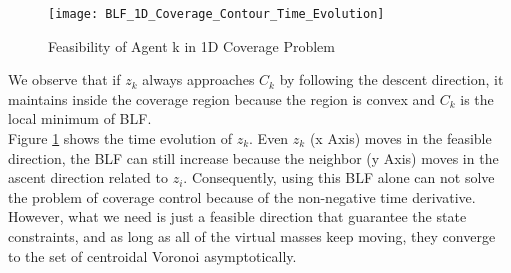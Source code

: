 \begin{figure} [!h]
	\centering
	\texttt{[image: BLF\_1D\_Coverage\_Contour\_Time\_Evolution]}
	\caption{Feasibility of Agent k in 1D Coverage Problem}
	\label{fig:BLF_2D_2}
\end{figure}
\noindent We observe that if $z_k$ always approaches $C_k$ by following the descent direction, it maintains inside the coverage region because the region is convex and $C_k$ is the local minimum of BLF. \\
Figure \ref{fig:BLF_2D_2} shows the time evolution of $z_k$. Even $z_k$ (x Axis) moves in the feasible direction, the BLF can still increase because the neighbor (y Axis) moves in the ascent direction related to $z_i$. Consequently, using this BLF alone can not solve the problem of coverage control because of the non-negative time derivative. However, what we need is just a feasible direction that guarantee the state constraints, and as long as all of the virtual masses keep moving, they converge to the set of centroidal Voronoi asymptotically. 



